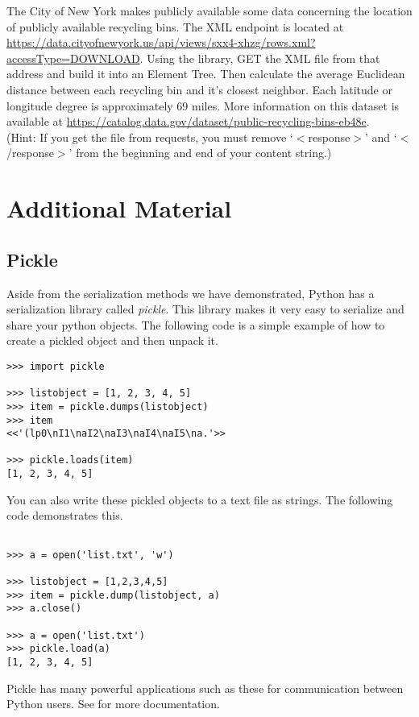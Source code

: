 \begin{problem}
The City of New York makes publicly available some data concerning the location of publicly available recycling bins.
The XML endpoint is located at \url{https://data.cityofnewyork.us/api/views/sxx4-xhzg/rows.xml?accessType=DOWNLOAD}.
Using the  library, GET the XML file from that address and build it into an Element Tree.
Then calculate the average Euclidean distance between each recycling bin and it's closest neighbor.
Each latitude or longitude degree is approximately 69 miles.
More information on this dataset is available at \url{https://catalog.data.gov/dataset/public-recycling-bins-eb48e}.
\\ (Hint: If you get the file from requests, you must remove `$<$response$>$' and `$<$/response$>$' from the beginning and end of your content string.)
\end{problem}

\newpage

\section*{Additional Material} %

\subsection*{Pickle} %

Aside from the serialization methods we have demonstrated, Python has a serialization library called \emph{pickle}.
This library makes it very easy to serialize and share your python objects.
The following code is a simple example of how to create a pickled object and then unpack it.

\begin{lstlisting}
>>> import pickle

>>> listobject = [1, 2, 3, 4, 5]
>>> item = pickle.dumps(listobject)
>>> item
<<'(lp0\nI1\naI2\naI3\naI4\naI5\na.'>>

>>> pickle.loads(item)
[1, 2, 3, 4, 5]
\end{lstlisting}

You can also write these pickled objects to a text file as strings. The following code demonstrates this.
\begin{lstlisting}

>>> a = open('list.txt', 'w')

>>> listobject = [1,2,3,4,5]
>>> item = pickle.dump(listobject, a)
>>> a.close()

>>> a = open('list.txt')
>>> pickle.load(a)
[1, 2, 3, 4, 5]
\end{lstlisting}

Pickle has many powerful applications such as these for communication between Python users.
See  for more documentation.
